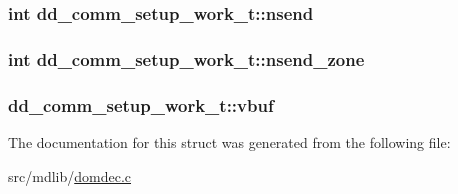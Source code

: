 \hypertarget{structdd__comm__setup__work__t_a86c7c026e667cb5ff6f019afda54ae5f}{
\subsubsection[{nsend}]{\setlength{\rightskip}{0pt plus 5cm}int {\bf dd\-\_\-comm\-\_\-setup\-\_\-work\-\_\-t\-::nsend}}}\label{structdd__comm__setup__work__t_a86c7c026e667cb5ff6f019afda54ae5f}
\hypertarget{structdd__comm__setup__work__t_aed625bfe4677adf11ccb53bbb129d8c3}{
\subsubsection[{nsend\-\_\-zone}]{\setlength{\rightskip}{0pt plus 5cm}int {\bf dd\-\_\-comm\-\_\-setup\-\_\-work\-\_\-t\-::nsend\-\_\-zone}}}\label{structdd__comm__setup__work__t_aed625bfe4677adf11ccb53bbb129d8c3}
\hypertarget{structdd__comm__setup__work__t_aa149d7bcabe602950e0605da6065ead7}{
\subsubsection[{vbuf}]{ {\bf dd\-\_\-comm\-\_\-setup\-\_\-work\-\_\-t\-::vbuf}}}\label{structdd__comm__setup__work__t_aa149d7bcabe602950e0605da6065ead7}


\-The documentation for this struct was generated from the following file\-:\begin{DoxyCompactItemize}
\item 
src/mdlib/\hyperlink{domdec_8c}{domdec.\-c}\end{DoxyCompactItemize}
